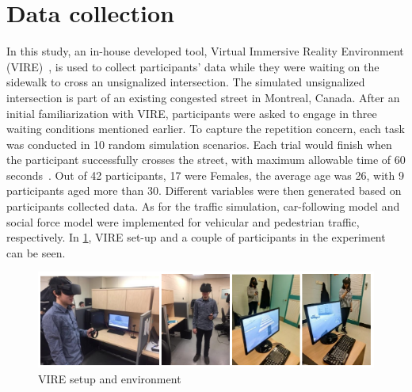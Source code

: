 \section{Data collection}
\label{S:D3}
In this study, an in-house developed tool, Virtual Immersive Reality Environment (VIRE)~\cite{farooq2018virtual}, is used to collect participants’ data while they were waiting on the sidewalk to cross an unsignalized intersection. The simulated unsignalized intersection is part of an existing congested street in Montreal, Canada. After an initial familiarization with VIRE, participants were asked to engage in three waiting conditions mentioned earlier. To capture the repetition concern, each task was conducted in 10 random simulation scenarios. Each trial would finish when the participant successfully crosses the street, with maximum allowable time of 60 seconds~\cite{sobhani2018impact}. Out of 42 participants, 17 were Females, the average age was 26, with 9 participants aged more than 30. Different variables were then generated based on participants collected data. As for the traffic simulation, car-following model and social force model were implemented for vehicular and pedestrian traffic, respectively. In \cref{fig:DVIRE}, VIRE set-up and a couple of participants in the experiment can be seen.
\begin{figure}
    \centering
    \includegraphics[scale=0.6]{chapter_3/figures/distract.png}
    \caption{VIRE setup and environment}
    \label{fig:DVIRE}
\end{figure}
